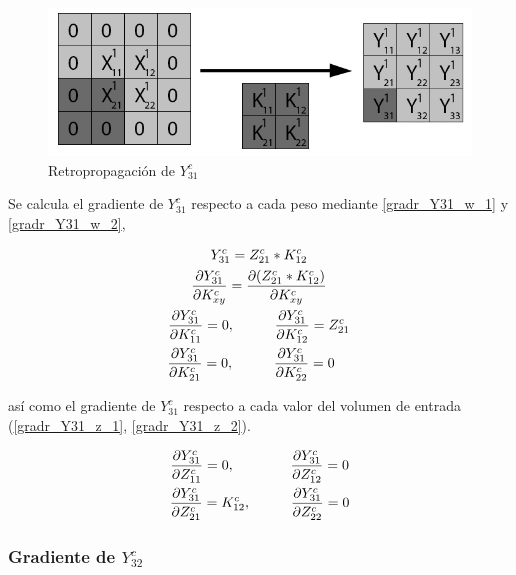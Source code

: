 \begin{figure}[H]
	\centering
	\includegraphics[width=0.8\linewidth]{imagenes/conv_back_padding_7.jpg} 
	\caption{Retropropagación de $Y^c_{31}$}
\end{figure}

Se calcula el gradiente de $Y^c_{31}$ respecto a cada peso mediante \ref{gradr_Y31_w_1} y \ref{gradr_Y31_w_2},

\begin{gather}
	Y^c_{31} = Z^c_{21} * K^c_{12} \\
	\frac{\partial Y^c_{31}}{\partial K^c_{xy}} = \frac{\partial (Z^c_{21} * K^c_{12})}{\partial K^c_{xy}} \\
	\frac{\partial Y^c_{31}}{\partial K^c_{11}} = 0, \hspace{10mm} \frac{\partial Y^c_{31}}{\partial K^c_{12}} = Z^c_{21} \label{gradr_Y31_w_1} \\
	\frac{\partial Y^c_{31}}{\partial K^c_{21}} = 0, \hspace{10mm} \frac{\partial Y^c_{31}}{\partial K^c_{22}} = 0 \hspace{4mm} \label{gradr_Y31_w_2}
\end{gather}

así como el gradiente de $Y^c_{31}$ respecto a cada valor del volumen de entrada (\ref{gradr_Y31_z_1}, \ref{gradr_Y31_z_2}).

\begin{gather}
	\frac{\partial Y^c_{31}}{\partial Z^c_{11}} = 0, \hspace{14mm} \frac{\partial Y^c_{31}}{\partial Z^c_{12}} = 0 \label{gradr_Y31_z_1} \\
	\frac{\partial Y^c_{31}}{\partial Z^c_{21}} = K^c_{12}, \hspace{10mm} \frac{\partial Y^c_{31}}{\partial Z^c_{22}} = 0 \label{gradr_Y31_z_2}
\end{gather}


\subsubsection{Gradiente de $Y^c_{32}$}

